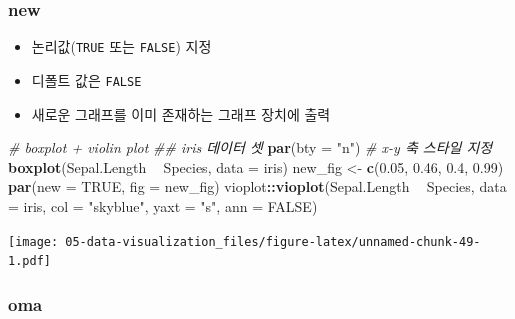 \documentclass[
  11pt,
]{krantz}
\makeatletter
\newenvironment{Shaded}{\begin{snugshade}}{\end{snugshade}}
\newcommand{\CommentTok}[1]{\textcolor[rgb]{0.37,0.37,0.37}{\textit{#1}}}
\newcommand{\DataTypeTok}[1]{\textcolor[rgb]{0.27,0.27,0.27}{#1}}
\newcommand{\FloatTok}[1]{\textcolor[rgb]{0.06,0.06,0.06}{#1}}
\newcommand{\KeywordTok}[1]{\textcolor[rgb]{0.27,0.27,0.27}{\textbf{#1}}}
\newcommand{\NormalTok}[1]{#1}
\newcommand{\OperatorTok}[1]{\textcolor[rgb]{0.43,0.43,0.43}{\textbf{#1}}}
\newcommand{\OtherTok}[1]{\textcolor[rgb]{0.37,0.37,0.37}{#1}}
\newcommand{\StringTok}[1]{\textcolor[rgb]{0.5,0.5,0.5}{#1}}
\providecommand{\tightlist}{%
  \setlength{\itemsep}{0pt}\setlength{\parskip}{0pt}}
\newenvironment{kframe}{%
\medskip{}
\setlength{\fboxsep}{.8em}
 \def\at@end@of@kframe{}%
 \ifinner\ifhmode%
  \def\at@end@of@kframe{\end{minipage}}%
  \begin{minipage}{\columnwidth}%
 \fi\fi%
 \def\FrameCommand##1{\hskip\@totalleftmargin \hskip-\fboxsep
 \colorbox{shadecolor}{##1}\hskip-\fboxsep
     \hskip-\linewidth \hskip-\@totalleftmargin \hskip\columnwidth}%
 \MakeFramed {\advance\hsize-\width
   \@totalleftmargin\z@ \linewidth\hsize
   \@setminipage}}%
 {\par\unskip\endMakeFramed%
 \at@end@of@kframe}
\renewenvironment{quote}{\begin{kframe}}{\end{kframe}}
\makeatother
\begin{document}
\normalsize

\hypertarget{new}{%
\subsubsection*{\texorpdfstring{\textbf{new}}{new}}\label{new}}


\begin{quote}
\begin{itemize}
\tightlist
\item
  논리값(\texttt{TRUE} 또는 \texttt{FALSE}) 지정
\item
  디폴트 값은 \texttt{FALSE}
\item
  새로운 그래프를 이미 존재하는 그래프 장치에 출력
\end{itemize}
\end{quote}

\footnotesize

\begin{Shaded}
\begin{Highlighting}[]
\CommentTok{# boxplot + violin plot}
\CommentTok{## iris 데이터 셋}
\KeywordTok{par}\NormalTok{(}\DataTypeTok{bty =} \StringTok{"n"}\NormalTok{) }\CommentTok{# x-y 축 스타일 지정}
\KeywordTok{boxplot}\NormalTok{(Sepal.Length }\OperatorTok{~}\StringTok{ }\NormalTok{Species,}
        \DataTypeTok{data =}\NormalTok{ iris)}
\NormalTok{new_fig <-}\StringTok{ }\KeywordTok{c}\NormalTok{(}\FloatTok{0.05}\NormalTok{, }\FloatTok{0.46}\NormalTok{, }\FloatTok{0.4}\NormalTok{, }\FloatTok{0.99}\NormalTok{)}
\KeywordTok{par}\NormalTok{(}\DataTypeTok{new =} \OtherTok{TRUE}\NormalTok{,}
    \DataTypeTok{fig =}\NormalTok{ new_fig)}
\NormalTok{vioplot}\OperatorTok{::}\KeywordTok{vioplot}\NormalTok{(Sepal.Length }\OperatorTok{~}\StringTok{ }\NormalTok{Species,}
                 \DataTypeTok{data =}\NormalTok{ iris,}
                 \DataTypeTok{col =} \StringTok{"skyblue"}\NormalTok{,}
                 \DataTypeTok{yaxt =} \StringTok{"s"}\NormalTok{,}
                 \DataTypeTok{ann =} \OtherTok{FALSE}\NormalTok{)}
\end{Highlighting}
\end{Shaded}

\texttt{[image: 05-data-visualization\_files/figure-latex/unnamed-chunk-49-1.pdf]}

\normalsize

\hypertarget{oma}{%
\subsubsection*{\texorpdfstring{\textbf{oma}}{oma}}\label{oma}}
\end{document}
